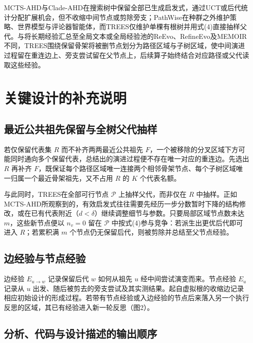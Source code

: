 \documentclass{article}
\begin{document}
MCTS-AHD与Clade-AHD在搜索树中保留全部已生成启发式，通过UCT或后代统计分配扩展机会\citep{mctsahd, cladeahd}，但不收缩中间节点或剪除旁支；PathWise在种群之外维护策略、世界模型与评论器智能体\citep{pathwise}，而TREES仅维护单棵有根树并用式(4)直接抽样父代。与将长期经验汇总至全局文本或全局经验池的ReEvo、RefineEvo及MEMOIR\citep{reevo, refineevo, memorytree}不同，TREES围绕保留骨架将被删节点划分为路径区域与子树区域，使中间演进过程留在重连边上、旁支尝试留在父节点上，后续算子始终结合对应路径或父代读取这些经验。

\section{关键设计的补充说明}\label{ux5173ux952eux8bbeux8ba1ux7684ux8865ux5145ux8bf4ux660e}

\subsection{最近公共祖先保留与全树父代抽样}\label{ux6700ux8fd1ux516cux5171ux7956ux5148ux4fddux7559ux4e0eux5168ux6811ux7236ux4ee3ux62bdux6837}

若仅保留代表集 \(R\) 而不补齐两两最近公共祖先 \(F\)，一个被移除的分叉区域下方可能同时通向多个保留代表，总结出的演进过程便不存在唯一对应的重连边。先选出 \(R\) 再补齐 \(F\)，既保证每个路径区域唯一连接两个相邻骨架节点、每个子树区域唯一归属一个最近骨架祖先，又不占用 \(R\) 的 \(K\) 个代表名额。

与此同时，TREES在全部可行节点 \(\mathcal P\) 上抽样父代，而非仅在 \(R\) 中抽样。正如MCTS-AHD所观察到的，有效启发式往往需要先经历一步分数暂时下降的结构修改，或在已有代表附近（\(d<\delta\)）继续调整细节与参数\citep{mctsahd}。只要局部区域节点数未达 \(m\)，这些新节点便以 \(n_v=0\) 留在 \(\mathcal P\) 中按式(4)参与竞争：若派生出更优后代即可进入 \(R\)；若累积满 \(m\) 个节点仍无保留后代，则被剪除并总结至父节点经验。

\subsection{边经验与节点经验}\label{ux8fb9ux7ecfux9a8cux4e0eux8282ux70b9ux7ecfux9a8c}

边经验 \(E_{u\to w}\) 记录保留后代 \(w\) 如何从祖先 \(u\) 经中间尝试演变而来。节点经验 \(E_u\) 记录从 \(u\) 出发、随后被剪去的旁支尝试及其实测结果。起自虚拟根的收缩边记录相应初始设计的形成过程。若带有节点经验或入边经验的节点后来落入另一个执行反思的区域，其已有经验进入新一轮反思（图2）。

\subsection{分析、代码与设计描述的输出顺序}\label{ux5206ux6790ux4ee3ux7801ux4e0eux8bbeux8ba1ux63cfux8ff0ux7684ux8f93ux51faux987aux5e8f}
\end{document}

